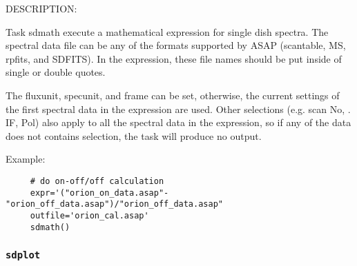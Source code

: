      DESCRIPTION:

     Task sdmath execute a mathematical expression for single dish spectra.
     The spectral data file can be any of the formats supported by
     ASAP (scantable, MS, rpfits, and SDFITS). In the expression, 
     these file names should be put inside of single or double quotes.

     The fluxunit, specunit, and frame can be set, otherwise, the current
     settings of the first spectral data in the expression are used.  
     Other selections (e.g. scan No, . IF, Pol) also apply to all 
     the spectral data in the expression, so if any of the data does
     not contains selection, the task will produce no output. 
     
     Example:
\begin{verbatim}
     # do on-off/off calculation
     expr='("orion_on_data.asap"-"orion_off_data.asap")/"orion_off_data.asap"
     outfile='orion_cal.asap'
     sdmath()
\end{verbatim}


\subsubsection{{\tt sdplot}}
\label{section:sd.sdtasks.tasks.sdplot}

